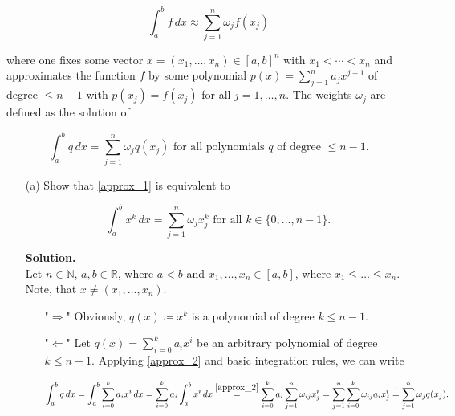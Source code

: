 \documentclass{article}
\begin{document}
\begin{equation*}
    \int_a^b f \, dx \approx \sum_{j = 1}^n \omega_j f(x_j)
\end{equation*}

where one fixes some vector $x = (x_1, \ldots, x_n) \in [a, b]^n$ with $x_1 < \cdots <
x_n$ and approximates the function $f$ by some polynomial $p(x) = \sum_{j = 1}^n a_j x^{j-1}$ of degree $\leq n - 1$ with $p(x_j) = f(x_j)$ for all $j = 1, \ldots, n$. The weights $\omega_j$ are defined as the solution of

\begin{equation} \label{approx_1}
    \int_a^b q \, dx = \sum_{j = 1}^n \omega_j q(x_j)
    \text{ for all polynomials $q$ of degree $\leq n - 1$.}
\end{equation}

\begin{itemize}
    \item[(a)] Show that \eqref{approx_1} is equivalent to
    
    \begin{equation} \label{approx_2}
        \int_a^b x^k \, dx = \sum_{j = 1}^n \omega_j x_j^k
        \text{ for all $k \in \{0, \ldots, n - 1\}$.}
    \end{equation}
    
    \textbf{Solution.} \\
    Let $n \in \mathbb{N}$, $a, b \in \mathbb{R}$, where $a < b$ and $x_1, \ldots, x_n \in [a, b]$, where $x_1 \leq \ldots \leq x_n$. \\
    Note, that $x \neq (x_1, \ldots, x_n).$
    \begin{itemize}
        \item["$\Rightarrow$"] Obviously, $q(x) \coloneqq x^k$ is a polynomial of degree $k \leq n - 1$.
        
        \item["$\Leftarrow$"] Let $q(x) = \sum_{i = 0}^k a_i x^{i}$ be an arbitrary polynomial of degree $k \leq n - 1$. Applying \eqref{approx_2} and basic integration rules, we can write
        
        \begin{equation*}
            \int_a^b q \, dx =
            \int_a^b \sum_{i = 0}^k a_i x^i \, dx =
            \sum_{i = 0}^k a_i \int_a^b x^i \, dx \stackrel{\eqref{approx_2}}{=}
            \sum_{i = 0}^k a_i \sum_{j = 1}^n \omega_{ij} x_j^i =
            \sum_{j = 1}^n \sum_{i = 0}^k \omega_{ij} a_i x_j^i \stackrel{!}{=}
            \sum_{j = 1}^n \omega_j q(x_j)
            \text{.}
        \end{equation*}
        

\end{itemize}
\end{itemize}
\end{document}
